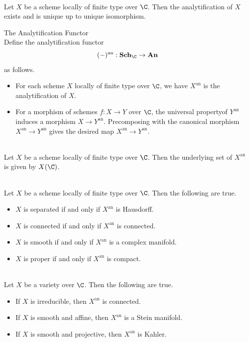 \documentclass[a4paper]{article}
\begin{document}
\begin{thm}{}{}\\
Let $X$ be a scheme locally of finite type over $\C$. Then the analytification of $X$ exists and is unique up to unique isomorphism. 
\end{thm}

\begin{defn}{The Analytification Functor}{}\\
Define the analytification functor $$(-)^\text{an}:\bold{Sch}_\C\to\bold{An}$$ as follows. 
\begin{itemize}
\item For each scheme $X$ locally of finite type over $\C$, we have $X^\text{an}$ is the analytification of $X$. 
\item For a morphism of schemes $f:X\to Y$ over $\C$, the universal propertyof $Y^\text{an}$ induces a morphism $X\to Y^\text{an}$. Precomposing with the canonical morphism $X^\text{an}\to Y^\text{an}$ gives the desired map $X^\text{an}\to Y^\text{an}$. 
\end{itemize}
\end{defn}

\begin{prp}{}{}\\
Let $X$ be a scheme locally of finite type over $\C$. Then the underlying set of $X^\text{an}$ is given by $X(\C)$. 
\end{prp}

\begin{prp}{}{}\\
Let $X$ be a scheme locally of finite type over $\C$. Then the following are true. 
\begin{itemize}
\item $X$ is separated if and only if $X^\text{an}$ is Hausdorff. 
\item $X$ is connected if and only if $X^\text{an}$ is connected. 
\item $X$ is smooth if and only if $X^\text{an}$ is a complex manifold. 
\item $X$ is proper if and only if $X^\text{an}$ is compact. 
\end{itemize}
\end{prp}

\begin{prp}{}{}\\
Let $X$ be a variety over $\C$. Then the following are true. 
\begin{itemize}
\item If $X$ is irreducible, then $X^\text{an}$ is connected. 
\item If $X$ is smooth and affine, then $X^\text{an}$ is a Stein manifold. 
\item If $X$ is smooth and projective, then $X^\text{an}$ is Kahler. 
\end{itemize}
\end{prp}
\end{document}
